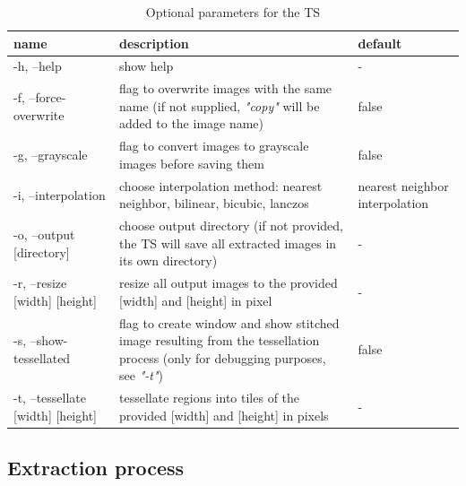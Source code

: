 \begin{table}[H]
	\begin{center}
		\begin{tabular}{| p{3cm} | p{5cm} | p{3cm} |}
			\hline
			\textbf{name} & \textbf{description} & \textbf{default}\\ \hline
			-h, --help & show help & - \\ \hline
			-f, --force-overwrite & flag to overwrite images with the same name (if not supplied, \emph{"{\textunderscore}copy"} will be added to the image name) & false \\ \hline
			-g, --grayscale & flag to convert images to grayscale images before saving them & false \\ \hline
			-i, --interpolation & choose interpolation method: nearest neighbor, bilinear, bicubic, lanczos  & nearest neighbor interpolation \\ \hline
			-o, --output [directory] & choose output directory (if not provided, the TS will save all extracted images in its own directory) & - \\ \hline
			-r, --resize [width] [height] & resize all output images to the provided [width] and [height] in pixel & - \\ \hline
			-s, --show-tessellated & flag to create window and show stitched image resulting from the tessellation process (only for debugging purposes, see \emph{"-t"}) & false\\ \hline
			-t, --tessellate [width] [height] & tessellate regions into tiles of the provided [width] and [height] in pixels & - \\ \hline
		\end{tabular}
		\caption{Optional parameters for the TS}
		\label{tab5_tsParams}
	\end{center}
\end{table}


\subsection{Extraction process}


